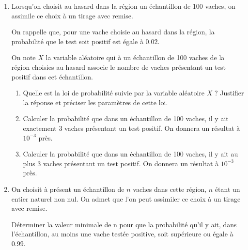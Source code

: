 \begin{enumerate}
	\item Lorsqu'on choisit au hasard dans la région un échantillon de 100 vaches, on assimile ce choix à un tirage avec remise.
	
	On rappelle que, pour une vache choisie au hasard dans la région, la probabilité que le test soit positif est égale à \num{0,02}.
	
	On note $X$ la variable aléatoire qui à un échantillon de 100 vaches de la région choisies au hasard associe le nombre de vaches présentant un test positif dans cet échantillon.
	\begin{enumerate}
		\item Quelle est la loi de probabilité suivie par la variable aléatoire $X$ ? Justifier la réponse et préciser les paramètres de cette loi.
		\item Calculer la probabilité que dans un échantillon de 100 vaches, il y ait exactement 3 vaches présentant un test positif. On donnera un résultat à $10^{-3}$ près.
		\item Calculer la probabilité que dans un échantillon de 100 vaches, il y ait au plus 3 vaches présentant un test positif. On donnera un résultat à $10^{-3}$ près.
	\end{enumerate}
	\item On choisit à présent un échantillon de $n$ vaches dans cette région, $n$ étant un entier naturel non nul. On admet que l’on peut assimiler ce choix à un tirage avec remise.
	
	Déterminer la valeur minimale de n pour que la probabilité qu’il y ait, dans l’échantillon, au moins une vache testée positive, soit supérieure ou égale à \num{0,99}.
\end{enumerate}
